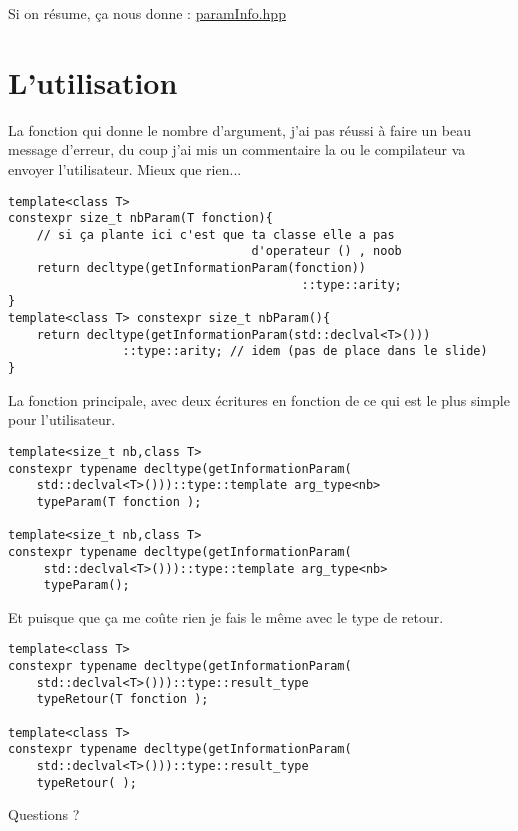 \documentclass{beamer}
\begin{document}
\begin{frame}
Si on résume, ça nous donne : 
	\href{run:paramInfo.hpp}{paramInfo.hpp}\\


\end{frame}


\section{L'utilisation}
\begin{frame}[containsverbatim]
La fonction qui donne le nombre d'argument, j'ai pas réussi à faire un beau message d'erreur, du coup j'ai mis un commentaire la ou le compilateur va envoyer l'utilisateur. Mieux que rien...
\begin{verbatim}
template<class T>
constexpr size_t nbParam(T fonction){
    // si ça plante ici c'est que ta classe elle a pas
                                  d'operateur () , noob
    return decltype(getInformationParam(fonction))
                                         ::type::arity;
}
template<class T> constexpr size_t nbParam(){
    return decltype(getInformationParam(std::declval<T>()))
    			::type::arity; // idem (pas de place dans le slide)
}
\end{verbatim}

\end{frame} 

\begin{frame}[containsverbatim]
La fonction principale, avec deux écritures en fonction de ce qui est le plus simple pour l'utilisateur. 
\begin{verbatim}
template<size_t nb,class T>
constexpr typename decltype(getInformationParam(
    std::declval<T>()))::type::template arg_type<nb>
    typeParam(T fonction );

template<size_t nb,class T>
constexpr typename decltype(getInformationParam(
     std::declval<T>()))::type::template arg_type<nb>
     typeParam();
\end{verbatim}

\end{frame} 


\begin{frame}[containsverbatim]
Et puisque que ça me coûte rien je fais le même avec le type de retour.  
\begin{verbatim}
template<class T>
constexpr typename decltype(getInformationParam(
    std::declval<T>()))::type::result_type 
    typeRetour(T fonction );

template<class T>
constexpr typename decltype(getInformationParam(
    std::declval<T>()))::type::result_type 
    typeRetour( );
\end{verbatim}

\end{frame} 



\begin{frame}
    \begin{center}
        \Huge Questions ? 
    \end{center}
\end{frame}
\end{document}
